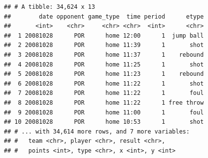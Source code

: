 \documentclass[10pt,]{krantz}
\makeatletter
\newenvironment{Shaded}{\begin{snugshade}}{\end{snugshade}}
\newcommand{\StringTok}[1]{\textcolor[rgb]{0.31,0.60,0.02}{#1}}
\newcommand{\CommentTok}[1]{\textcolor[rgb]{0.56,0.35,0.01}{\textit{#1}}}
\newcommand{\OperatorTok}[1]{\textcolor[rgb]{0.81,0.36,0.00}{\textbf{#1}}}
\newcommand{\NormalTok}[1]{#1}
\newenvironment{kframe}{%
\medskip{}
\setlength{\fboxsep}{.8em}
 \def\at@end@of@kframe{}%
 \ifinner\ifhmode%
  \def\at@end@of@kframe{\end{minipage}}%
  \begin{minipage}{\columnwidth}%
 \fi\fi%
 \def\FrameCommand##1{\hskip\@totalleftmargin \hskip-\fboxsep
 \colorbox{shadecolor}{##1}\hskip-\fboxsep
     \hskip-\linewidth \hskip-\@totalleftmargin \hskip\columnwidth}%
 \MakeFramed {\advance\hsize-\width
   \@totalleftmargin\z@ \linewidth\hsize
   \@setminipage}}%
 {\par\unskip\endMakeFramed%
 \at@end@of@kframe}
\renewenvironment{Shaded}{\begin{kframe}}{\end{kframe}}
\makeatother
\begin{document}
\begin{Shaded}
\end{Shaded}

\begin{verbatim}
## # A tibble: 34,624 x 13
##        date opponent game_type  time period      etype
##       <int>    <chr>     <chr> <chr>  <int>      <chr>
##  1 20081028      POR      home 12:00      1  jump ball
##  2 20081028      POR      home 11:39      1       shot
##  3 20081028      POR      home 11:37      1    rebound
##  4 20081028      POR      home 11:25      1       shot
##  5 20081028      POR      home 11:23      1    rebound
##  6 20081028      POR      home 11:22      1       shot
##  7 20081028      POR      home 11:22      1       foul
##  8 20081028      POR      home 11:22      1 free throw
##  9 20081028      POR      home 11:00      1       foul
## 10 20081028      POR      home 10:53      1       shot
## # ... with 34,614 more rows, and 7 more variables:
## #   team <chr>, player <chr>, result <chr>,
## #   points <int>, type <chr>, x <int>, y <int>
\end{verbatim}
\end{document}
